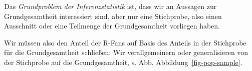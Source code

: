 \documentclass[
  a4paper,
  DIV=11]{scrreprt}
\theoremstyle{definition}
\theoremstyle{remark}
\begin{document}
Das \emph{Grundproblem der Inferenzstatistik} ist, dass wir an Aussagen
zur Grundgesamtheit interessiert sind, aber nur eine Stichprobe, also
einen Ausschnitt oder eine Teilmenge der Grundgesamtheit vorliegen
haben.

Wir müssen also den Anteil der R-Fans auf Basis des Anteils in der
Stichprobe für die Grundgesamtheit schließen: Wir verallgemeinern oder
generalisieren von der Stichprobe auf die Grundgesamtheit, s. Abb.
Abbildung~\ref{fig-pop-sample}.

\begin{figure}

\begin{minipage}[t]{0.50\linewidth}

{\centering 


}

\end{minipage}%
%
\begin{minipage}[t]{0.50\linewidth}

{\centering 

\raisebox{-\height}{

}}
\end{minipage}
\end{figure}
\end{document}
